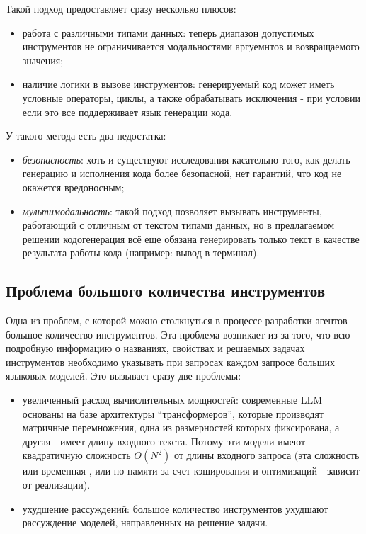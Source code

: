 Такой подход предоставляет сразу несколько плюсов:
\begin{itemize}
    \item работа с различными типами данных: теперь диапазон допустимых инструментов
не ограничивается модальностями аргуемнтов и возвращаемого значения; 
    \item наличие логики в вызове инструментов: генерируемый код может иметь условные 
операторы, циклы, а также обрабатывать исключения - при условии если это все поддерживает
язык генерации кода.
\end{itemize}

У такого метода есть два недостатка:
\begin{itemize}
    \item \textit{безопасность}: хоть и существуют исследования касательно того, 
как делать генерацию и исполнения кода более безопасной, нет гарантий, что 
код не окажется вредоносным;
    \item \textit{мультимодальность}: такой подход позволяет вызывать инструменты, 
работающий с отличным от текстом типами данных, но в предлагаемом решении кодогенерация 
всё еще обязана генерировать только текст в качестве результата работы кода 
(например: вывод в терминал).
\end{itemize}

\subsection{Проблема большого количества инструментов} \label{ch2:sec1:subsec4}

Одна из проблем, с которой можно столкнуться в процессе разработки агентов - большое
количество инструментов. Эта проблема возникает из-за того, что всю подробную информацию
о названиях, свойствах и решаемых задачах инструментов необходимо указывать при запросах 
каждом запросе больших языковых моделей. Это вызывает сразу две проблемы:
\begin{itemize}
    \item увеличенный расход вычислительных мощностей: современные LLM 
основаны на базе архитектуры ``трансформеров'', которые производят матричные перемножения,
одна из размерностей которых фиксирована, а другая - имеет длину входного текста.
Потому эти модели имеют квадратичную сложность $O(N^2)$ от длины входного запроса (эта
сложность или временная \cite{attn_need}, или по памяти за счет кэширования и 
оптимизаций\cite{cached_kv} - зависит от реализации).
    \item ухудшение рассуждений: большое количество инструментов ухудшают рассуждение 
моделей, направленных на решение задачи. 
\end{itemize}


